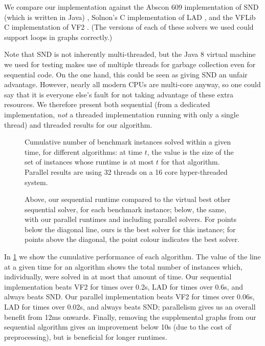 \documentclass{llncs}
\begin{document}
We compare our implementation against the Abscon 609 implementation of SND (which is written in
Java) \cite{Audemard:2014}, Solnon's C implementation of LAD \cite{Solnon:2010}, and the VFLib C
implementation of VF2 \cite{Cordella:2004}. (The versions of each of these solvers we used could
support loops in graphs correctly.)

Note that SND is not inherently multi-threaded, but the Java 8 virtual machine we used for testing
makes use of multiple threads for garbage collection even for sequential code. On the one hand,
this could be seen as giving SND an unfair advantage. However, nearly all modern CPUs are multi-core
anyway, so one could say that it is everyone else's fault for not taking advantage of these extra
resources. We therefore present both sequential (from a dedicated implementation, \emph{not} a
threaded implementation running with only a single thread) and threaded results for our algorithm.

\begin{figure}[tb]
    \centering
    

    \caption{Cumulative number of benchmark instances solved within a given time, for different
    algorithms: at time $t$, the value is the size of the set of instances whose runtime is at most
    $t$ for that algorithm. Parallel results are using 32 threads on a 16 core hyper-threaded
    system.}
    \label{figure:cumulative}
\end{figure}

\begin{figure}[p]
    \centering
    

    \caption{Above, our sequential runtime compared to the virtual best other sequential solver,
        for each benchmark instance; below, the same, with our parallel runtimes and including
        parallel solvers. For points below the diagonal line, ours is the best solver for this
        instance; for points above the diagonal, the point colour indicates the best solver.}
    \label{figure:best-other}
\end{figure}

In \cref{figure:cumulative} we show the cumulative performance of each algorithm. The value of the
line at a given time for an algorithm shows the total number of instances which, individually, were
solved in at most that amount of time. Our sequential implementation beats VF2 for times over 0.2s,
LAD for times over 0.6s, and always beats SND.  Our parallel implementation beats VF2 for times over
0.06s, LAD for times over 0.02s, and always beats SND; parallelism gives us an overall benefit from
12ms onwards. Finally, removing the supplemental graphs from our sequential algorithm gives an
improvement below 10s (due to the cost of preprocessing), but is beneficial for longer runtimes.
\end{document}
